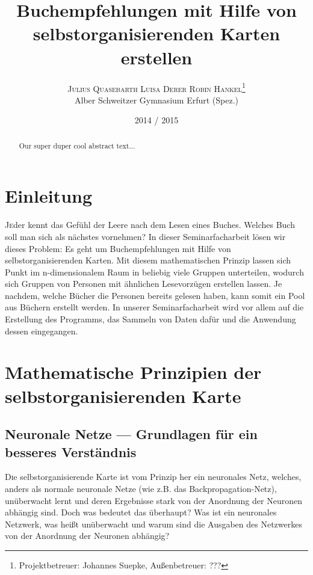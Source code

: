 \documentclass[twoside,a4paper,draft]{article}
\title{\vspace{-15mm}\fontsize{24pt}{10pt}\selectfont\bfseries{}Buchempfehlungen mit Hilfe von selbstorganisierenden Karten erstellen}
\author{\large\textsc{Julius Quasebarth \quad Luisa Derer \quad Robin Hankel}\thanks{Projektbetreuer: Johannes Suepke, Außenbetreuer: ???}\\[2mm]\normalsize Alber Schweitzer Gymnasium Erfurt (Spez.)\\\vspace{-5mm}}
\date{2014 / 2015}
\newcommand{\commonlettrine}[1]{\lettrine[nindent=0em,lines=2]{#1}}
\begin{document}
\maketitle

\thispagestyle{fancy}


\begin{otherlanguage}{english}
\begin{abstract}
\noindent
Our super duper cool abstract text...
\end{abstract}
\end{otherlanguage}

\tableofcontents

\begin{multicols}{2}

\section{Einleitung}

\commonlettrine{J}eder kennt das Gefühl der Leere nach dem Lesen eines Buches. Welches Buch soll man sich als nächstes vornehmen? In dieser Seminarfacharbeit lösen wir dieses Problem: Es geht um Buchempfehlungen mit Hilfe von selbstorganisierenden Karten. Mit diesem mathematischen Prinzip lassen sich Punkt im n-dimensionalem Raum in beliebig viele Gruppen unterteilen, wodurch sich Gruppen von Personen mit ähnlichen Lesevorzügen erstellen lassen. Je nachdem, welche Bücher die Personen bereits gelesen haben, kann somit ein \glqq{}Pool\grqq{} aus Büchern erstellt werden. In unserer Seminarfacharbeit wird vor allem auf die Erstellung des Programms, das Sammeln von Daten dafür und die Anwendung dessen eingegangen.

\section{Mathematische Prinzipien der selbstorganisierenden Karte}
\subsection{Neuronale Netze --- Grundlagen für ein besseres Verständnis}

\commonlettrine{D}ie selbstorganisierende Karte ist vom Prinzip her ein neuronales Netz, welches, anders als \glqq{}normale\grqq{} neuronale Netze (wie z.B. das Backpropagation-Netz), unüberwacht lernt und deren Ergebnisse stark von der Anordnung der Neuronen abhängig sind. Doch was bedeutet das überhaupt? Was ist ein neuronales Netzwerk, was heißt \glqq{}unüberwacht\grqq{} und warum sind die Ausgaben des Netzwerkes von der Anordnung der Neuronen abhängig?


\end{multicols}
\end{document}
